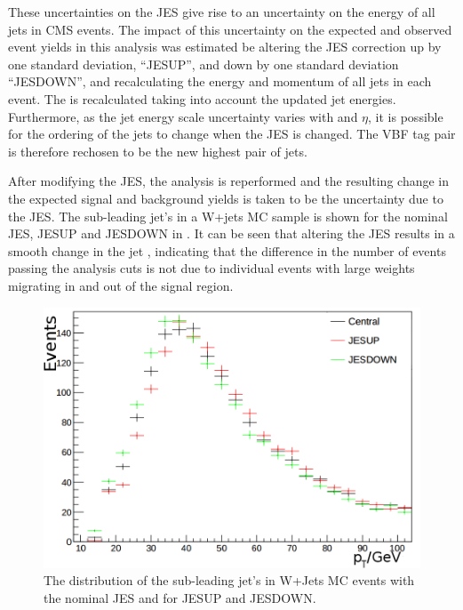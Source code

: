 These uncertainties on the \ac{JES} give rise to an uncertainty on the energy of all jets in CMS events. The impact of this uncertainty on the expected and observed event yields in this analysis was estimated be altering the \ac{JES} correction up by one standard deviation, ``JESUP'', and down by one standard deviation ``JESDOWN'', and recalculating the energy and momentum of all jets in each event. The \MET is recalculated taking into account the updated jet energies. Furthermore, as the jet energy scale uncertainty varies with \pt and $\eta$, it is possible for the \pt ordering of the jets to change when the \ac{JES} is changed. The \ac{VBF} tag pair is therefore rechosen to be the new highest \pt pair of jets. 

After modifying the \ac{JES}, the analysis is reperformed and the resulting change in the expected signal and background yields is taken to be the uncertainty due to the \ac{JES}. The sub-leading jet's \pt in a W+jets \ac{MC} sample is shown for the nominal \ac{JES}, JESUP and JESDOWN in . It can be seen that altering the \ac{JES} results in a smooth change in the jet \pt, indicating that the difference in the number of events passing the analysis cuts is not due to individual events with large weights migrating in and out of the signal region.

\begin{figure}
  \includegraphics[width=\largefigwidth]{plots/prompt/jescheckzoom.png}
  \caption{The distribution of the sub-leading jet's \pt in W+Jets \ac{MC} events with the nominal \ac{JES} and for JESUP and JESDOWN.}
  \label{fig:promptjes}
\end{figure}

